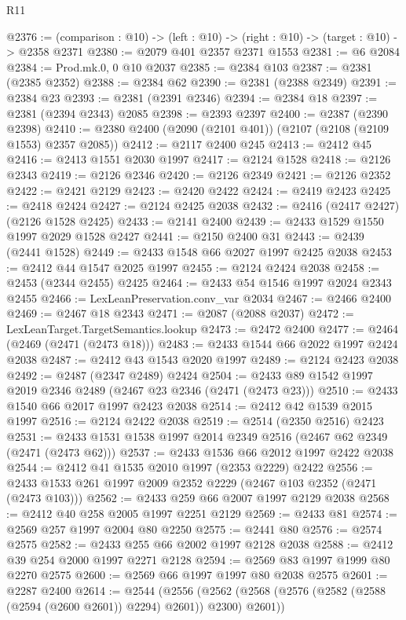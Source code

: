 \begin{lexlean}{R11}
\begin{coremodule}
@2376 := (comparison : @10) -> (left : @10) -> (right : @10) -> (target : @10) -> @2358 @2371
@2380 := @2079 @401 @2357 @2371 @1553
@2381 := @6 @2084
@2384 := Prod.mk.{0, 0} @10 @2037
@2385 := @2384 @103
@2387 := @2381 (@2385 @2352)
@2388 := @2384 @62
@2390 := @2381 (@2388 @2349)
@2391 := @2384 @23
@2393 := @2381 (@2391 @2346)
@2394 := @2384 @18
@2397 := @2381 (@2394 @2343) @2085
@2398 := @2393 @2397
@2400 := @2387 (@2390 @2398)
@2410 := @2380 @2400 (@2090 (@2101 @401)) (@2107 (@2108 (@2109 @1553) @2357 @2085))
@2412 := @2117 @2400 @245
@2413 := @2412 @45
@2416 := @2413 @1551 @2030 @1997
@2417 := @2124 @1528
@2418 := @2126 @2343
@2419 := @2126 @2346
@2420 := @2126 @2349
@2421 := @2126 @2352
@2422 := @2421 @2129
@2423 := @2420 @2422
@2424 := @2419 @2423
@2425 := @2418 @2424
@2427 := @2124 @2425 @2038
@2432 := @2416 (@2417 @2427) (@2126 @1528 @2425)
@2433 := @2141 @2400
@2439 := @2433 @1529 @1550 @1997 @2029 @1528 @2427
@2441 := @2150 @2400 @31
@2443 := @2439 (@2441 @1528)
@2449 := @2433 @1548 @66 @2027 @1997 @2425 @2038
@2453 := @2412 @44 @1547 @2025 @1997
@2455 := @2124 @2424 @2038
@2458 := @2453 (@2344 @2455) @2425
@2464 := @2433 @54 @1546 @1997 @2024 @2343 @2455
@2466 := LexLeanPreservation.conv_var @2034
@2467 := @2466 @2400
@2469 := @2467 @18 @2343
@2471 := @2087 (@2088 @2037)
@2472 := LexLeanTarget.TargetSemantics.lookup
@2473 := @2472 @2400
@2477 := @2464 (@2469 (@2471 (@2473 @18)))
@2483 := @2433 @1544 @66 @2022 @1997 @2424 @2038
@2487 := @2412 @43 @1543 @2020 @1997
@2489 := @2124 @2423 @2038
@2492 := @2487 (@2347 @2489) @2424
@2504 := @2433 @89 @1542 @1997 @2019 @2346 @2489 (@2467 @23 @2346 (@2471 (@2473 @23)))
@2510 := @2433 @1540 @66 @2017 @1997 @2423 @2038
@2514 := @2412 @42 @1539 @2015 @1997
@2516 := @2124 @2422 @2038
@2519 := @2514 (@2350 @2516) @2423
@2531 := @2433 @1531 @1538 @1997 @2014 @2349 @2516 (@2467 @62 @2349 (@2471 (@2473 @62)))
@2537 := @2433 @1536 @66 @2012 @1997 @2422 @2038
@2544 := @2412 @41 @1535 @2010 @1997 (@2353 @2229) @2422
@2556 := @2433 @1533 @261 @1997 @2009 @2352 @2229 (@2467 @103 @2352 (@2471 (@2473 @103)))
@2562 := @2433 @259 @66 @2007 @1997 @2129 @2038
@2568 := @2412 @40 @258 @2005 @1997 @2251 @2129
@2569 := @2433 @81
@2574 := @2569 @257 @1997 @2004 @80 @2250
@2575 := @2441 @80
@2576 := @2574 @2575
@2582 := @2433 @255 @66 @2002 @1997 @2128 @2038
@2588 := @2412 @39 @254 @2000 @1997 @2271 @2128
@2594 := @2569 @83 @1997 @1999 @80 @2270 @2575
@2600 := @2569 @66 @1997 @1997 @80 @2038 @2575
@2601 := @2287 @2400
@2614 := @2544
    (@2556 (@2562 (@2568 (@2576 (@2582 (@2588 (@2594 (@2600 @2601)) @2294) @2601)) @2300) @2601))

\end{coremodule}
\end{lexlean}
